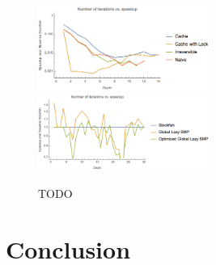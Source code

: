 \documentclass{article}
\begin{document}
\begin{figure}
	\includegraphics[width=0.5\textwidth]{../plots/speedup_bad}
	\includegraphics[width=0.5\textwidth]{../plots/speedup_good}
	\caption{TODO}
	\label{fig:speedup-separate}
\end{figure}





\section{Conclusion}


\pagebreak
\pagestyle{empty}



\end{document}
